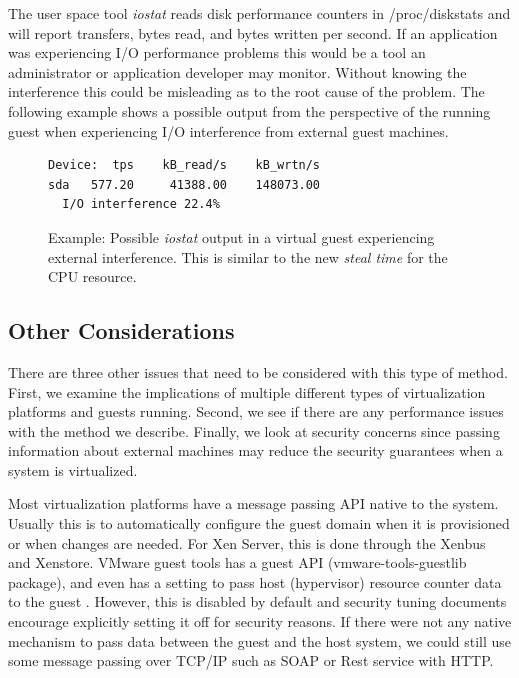 The user space tool \emph{iostat} reads disk performance counters in /proc/diskstats and will report transfers, bytes read, and bytes written per second.  If an application was experiencing I/O performance problems this would be a tool an administrator or application developer may monitor.  Without knowing the interference this could be misleading as to the root cause of the problem.  The following example shows a possible output from the perspective of the running guest when experiencing I/O interference from external guest machines.

\begin{figure}[h]
\begin{Verbatim}
Device:  tps    kB_read/s    kB_wrtn/s
sda   577.20     41388.00    148073.00
  I/O interference 22.4%     
\end{Verbatim}
\label{fig:iostat}
\caption{Example:  Possible \emph{iostat} output in a virtual guest experiencing external interference.  This is similar to the new \emph{steal time} for the CPU resource.}
\end{figure}

\subsection{Other Considerations}
There are three other issues that need to be considered with this type of method.  First, we examine the implications of multiple different types of virtualization platforms and guests running.  Second, we see if there are any performance issues with the method we describe.  Finally, we look at security concerns since passing information about external machines may reduce the security guarantees when a system is virtualized.

Most virtualization platforms have a message passing API native to the system.  Usually this is to automatically configure the guest domain when it is provisioned or when changes are needed.  For Xen Server, this is done through the Xenbus and Xenstore.  VMware guest tools has a guest API (vmware-tools-guestlib package), and even has a setting to pass host (hypervisor) resource counter data to the guest \cite{vmwarepubs}.  However, this is disabled by default and security tuning documents encourage explicitly setting it off for security reasons. If there were not any native mechanism to pass data between the guest and the host system, we could still use some message passing over TCP/IP such as SOAP or Rest service with HTTP.

